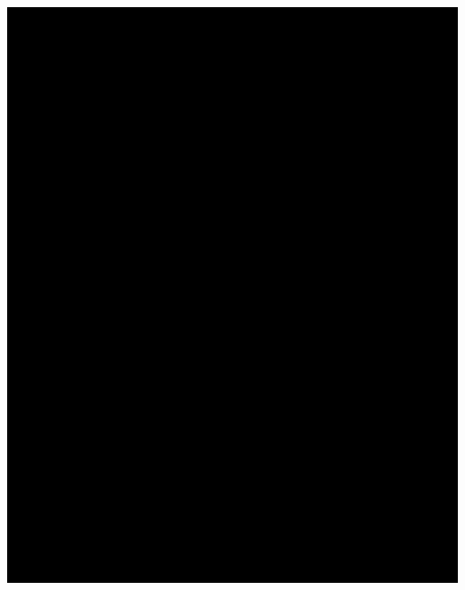 \Continuing
\begin{center}
    \includegraphics[width=36em]{php-one-company-role-p2_public}
\end{center}

\pagebreak
